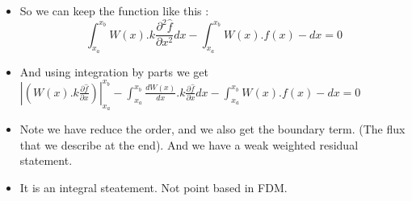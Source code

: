	\begin{frame}
		\begin{itemize}
			\item So we can keep the function like this :
			\begin{equation}   
			\int_{x_a}^{x_b} W(x).k \frac{\partial^2 \hat{f}}{\partial x^2} dx- \int_{x_a}^{x_b} W(x).f(x) - dx = 0
			\end{equation}
			\item And using integration by parts we get \\
			$	\left|\left(W(x).k \frac{\partial \hat{f}}{\partial x} \right) \right|^{x_b}_{x_a}- \int_{x_a}^{x_b} \frac{dW(x)}{dx}.k \frac{\partial \hat{f}}{\partial x} dx -  \int_{x_a}^{x_b} W(x).f(x) - dx = 0$
			\item Note we have reduce the order, and we also get the boundary term. (The flux that we describe at the end). And we have a weak weighted residual statement.
			\item It is an integral steatement. Not point based in FDM.  
		\end{itemize}
	\end{frame}


